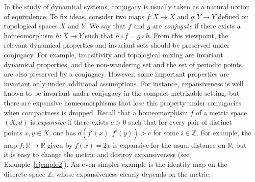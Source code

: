 \documentclass[12pt]{amsart}
\newcommand{\R}{\mathbb R}
\newcommand{\Z}{\mathbb Z}
\theoremstyle{plain}
\theoremstyle{definition}
\theoremstyle{remark}
\begin{document}
In the study of dynamical systems, conjugacy is usually taken as a natural notion of equivalence. To fix ideas, consider two maps $f\colon X\to X$ and $g\colon Y\to Y$ defined on topological spaces $X$ and $Y$. We say that $f$ and $g$ are \textit{conjugate} if there exists a homeomorphism $h\colon X\to Y$ such that $h\circ f=g\circ h$. From this viewpoint, the relevant dynamical properties and invariant sets should be preserved under conjugacy. For example, transitivity and topological mixing are invariant dynamical properties, and the non-wandering set and the set of periodic points are also preserved by a conjugacy.
However, some important properties are invariant only under additional assumptions. For instance, expansiveness is well known to be invariant under conjugacy in the compact metrizable setting, but there are expansive homeomorphisms that lose this property under conjugacies when compactness is dropped. Recall that a homeomorphism $f$ of a metric space $(X,d)$ is \textit{expansive} if there exists $c>0$ such that for every pair of distinct points $x,y\in X$, one has $d(f^i(x),f^i(y))>c$ for some $i\in\Z$.
For example, the map $f\colon\R\to\R$ given by $f(x)=2x$ is expansive for the usual distance on $\R$, but it is easy to change the metric and destroy expansiveness (see Example~\ref{ejemplo2}). An even simpler example is the identity map on the discrete space $\Z$, whose expansiveness clearly depends on the metric.
\end{document}
